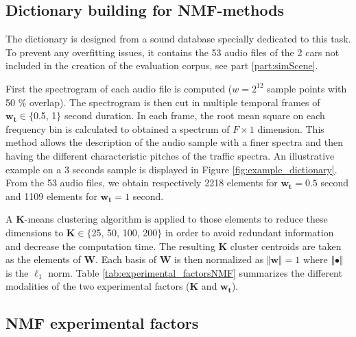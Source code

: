 \documentclass[review,5p,twocolumn,sort&compress,times]{elsarticle}
\begin{document}
\subsection{Dictionary building for NMF-methods}\label{part:dictionary_building}

The dictionary is designed from a sound database specially dedicated to this task. To prevent any overfitting issues, it contains the 53 audio files of the 2 cars not included  in the creation of the evaluation corpus, see part \ref{part:simScene}.

First the spectrogram of each audio file is computed ($w = 2^{12}$ sample points with 50 $\%$ overlap). The spectrogram is then cut in multiple temporal frames of $\mathbf{w_t}  \in \lbrace$0.5, 1$\rbrace$ second duration. In each frame, the root mean square on each frequency bin is calculated to obtained a spectrum of $F \times 1$ dimension. This method allows the description of the audio sample with a finer spectra and then having the different characteristic pitches of the traffic spectra. An illustrative example on a 3 seconds sample is displayed in Figure \ref{fig:example_dictionary}. From the 53 audio files, we obtain respectively 2218 elements for $\mathbf{w_t} = 0.5$ second and 1109 elements for $\mathbf{w_t} = 1$ second.

A $\mathbf{K}$-means clustering algorithm is applied to those elements to reduce these dimensions to $\mathbf{K} \in \lbrace$25, 50, 100, 200$\rbrace$ in order to avoid redundant information and decrease the computation time. The resulting $\mathbf{K}$ cluster centroids are taken as the elements of $\mathbf{W}$. Each basis of $\mathbf{W}$ is then normalized as $ \Vert \mathbf{w} \Vert = 1$ where $\Vert \bullet \Vert$ is the $\ell_1$ norm. Table \ref{tab:experimental_factorsNMF} summarizes the different modalities of the two experimental factors ($\mathbf{K}$ and $\mathbf{w_t}$).

\subsection{NMF experimental factors}
\end{document}
